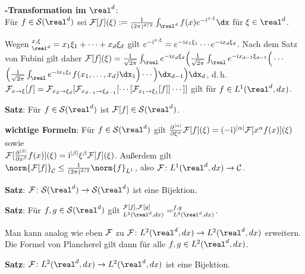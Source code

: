 \linie

\textbf{-Transformation im $\real^d$}:\\
Für $f \in \S(\real^d)$ sei $\F[f](\xi) := \frac{1}{(2\pi)^{d/2}}
\int_{\real^d} f(x) e^{-\i\sp{x, \xi}} \dx$ für $\xi \in \real^d$.

Wegen $\sp{x, \xi}_{\real^d} = x_1 \xi_1 + \dotsb + x_d \xi_d$ gilt
$e^{-\mathrm{i}\sp{x, \xi}} = e^{-\mathrm{i} x_1 \xi_1} \dotsm e^{-i x_d \xi_d}$.
Nach dem Satz von Fubini gilt daher
$\F[f](\xi) = \frac{1}{\sqrt{2\pi}} \int_\real e^{-\i x_d \xi_d}
\Big(\frac{1}{\sqrt{2\pi}} \int_\real e^{-\i x_{d-1} \xi_{d-1}}
\Big(\dotsb$\\
$\Big(\frac{1}{\sqrt{2\pi}} \int_\real e^{-\i x_1 \xi_1}
f(x_1, \dotsc, x_d) \dx_1\Big)\dotsb\Big)\dx_{d-1}\Big)\dx_d$, d.\,h.\\
$\mathcal{F}_{x \to \xi}[f] = \mathcal{F}_{x_d \to \xi_d}[\mathcal{F}_{x_{d-1} \to \xi_{d-1}}[\dotsb[
\mathcal{F}_{x_1 \to \xi_1}[f]]\dotsb]]$
gilt für $f \in L^1(\real^d, dx)$.

\textbf{Satz}:
Für $f \in \S(\real^d)$ ist $\F[f] \in \S(\real^d)$.

\textbf{wichtige Formeln}:
Für $f \in \S(\real^d)$ gilt
$\frac{\partial^{|\alpha|}}{\partial \xi^\alpha} \mathcal{F}[f](\xi) =
(-\mathrm{i})^{|\alpha|} \mathcal{F}[x^\alpha f(x)](\xi)$ sowie\\
$\mathcal{F}[\frac{\partial^{|\beta|}}{\partial x^\beta} f(x)](\xi) =
\mathrm{i}^{|\beta|} \xi^\beta \mathcal{F}[f](\xi)$.
Außerdem gilt
$\norm{\F[f]}_\C \le \frac{1}{(2\pi)^{d/2}} \norm{f}_{L^1}$,
also $\F\colon L^1(\real^d, dx) \rightarrow \C$.

\textbf{Satz}:
$\F\colon \S(\real^d) \rightarrow \S(\real^d)$ ist eine Bijektion.

\textbf{Satz}:
Für $f, g \in \S(\real^d)$ gilt
$\sp{\F[f], \F[g]}_{L^2(\real^d, dx)} = \sp{f, g}_{L^2(\real^d, dx)}$.

Man kann analog wie eben $\mathcal{F}$ zu
$\F\colon L^2(\real^d, dx) \rightarrow L^2(\real^d, dx)$ erweitern.
Die Formel von Plancherel gilt dann für alle $f, g \in L^2(\real^d, dx)$.

\textbf{Satz}:
$\F\colon L^2(\real^d, dx) \rightarrow L^2(\real^d, dx)$ ist eine Bijektion.

\pagebreak
